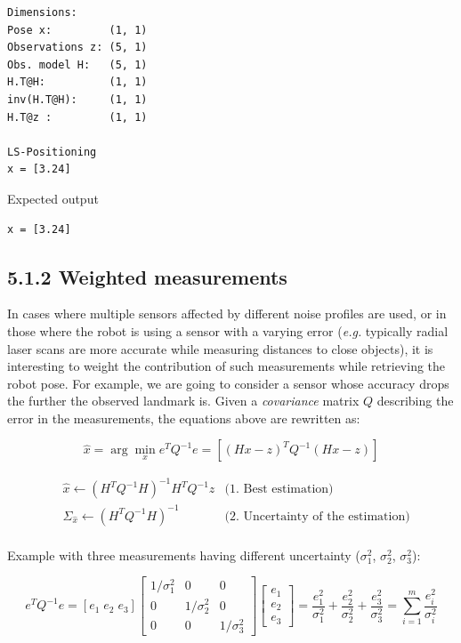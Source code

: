 \documentclass[11pt]{article}
\begin{document}
    \begin{Verbatim}[commandchars=\\\{\}]
Dimensions:
Pose x:         (1, 1)
Observations z: (5, 1)
Obs. model H:   (5, 1)
H.T@H:          (1, 1)
inv(H.T@H):     (1, 1)
H.T@z :         (1, 1)

LS-Positioning
x = [3.24]
    \end{Verbatim}

    {Expected output}

\begin{verbatim}
x = [3.24]
\end{verbatim}

    \hypertarget{weighted-measurements}{%
\subsection{5.1.2 Weighted measurements}\label{weighted-measurements}}

In cases where multiple sensors affected by different noise profiles are
used, or in those where the robot is using a sensor with a varying error
(\emph{e.g.} typically radial laser scans are more accurate while
measuring distances to close objects), it is interesting to weight the
contribution of such measurements while retrieving the robot pose. For
example, we are going to consider a sensor whose accuracy drops the
further the observed landmark is. Given a \emph{covariance} matrix \(Q\)
describing the error in the measurements, the equations above are
rewritten as:

\[ \hat x = \arg\min_{x} e^T Q^{-1} e = [(Hx-z)^TQ^{-1}(Hx-z)] \]

\[
    \begin{aligned}
      &\hat{x} \leftarrow (H^T Q^{-1} H)^{-1} H^T Q^{-1} z &\text{(1. Best estimation)}\\ 
      &\Sigma_{\hat{x}} \leftarrow (H^T Q^{-1} H)^{-1} &\text{(2. Uncertainty of the estimation)}\\
    \end{aligned}
  \]

Example with three measurements having different uncertainty
(\(\sigma_1^2\), \(\sigma_2^2\), \(\sigma_3^2\)):

\[
  e^T Q^{-1} e = [e_1 \; e_2 \; e_3]
  \begin{bmatrix} 1 / \sigma_1^2 & 0 & 0 \\ 0 & 1/\sigma_2^2 & 0 \\ 0 & 0 & 1/\sigma_3^2 \end{bmatrix} 
  \begin{bmatrix} e_1 \\ e_2 \\ e_3 \end{bmatrix}
  = \frac{e_1^2}{\sigma_1^2} + \frac{e_2^2}{\sigma_2^2} + \frac{e_3^2}{\sigma_3^2}
  = \sum_{i=1}^m \frac{e_i^2}{\sigma_i^2}
  \]
\end{document}
